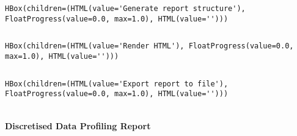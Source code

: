 \documentclass[11pt]{article}
\begin{document}
    
    \begin{Verbatim}[commandchars=\\\{\}]
HBox(children=(HTML(value='Generate report structure'), FloatProgress(value=0.0, max=1.0), HTML(value='')))
    \end{Verbatim}

    
    \begin{Verbatim}[commandchars=\\\{\}]

    \end{Verbatim}

    
    \begin{Verbatim}[commandchars=\\\{\}]
HBox(children=(HTML(value='Render HTML'), FloatProgress(value=0.0, max=1.0), HTML(value='')))
    \end{Verbatim}

    
    \begin{Verbatim}[commandchars=\\\{\}]

    \end{Verbatim}

    
    \begin{Verbatim}[commandchars=\\\{\}]
HBox(children=(HTML(value='Export report to file'), FloatProgress(value=0.0, max=1.0), HTML(value='')))
    \end{Verbatim}

    
    \begin{Verbatim}[commandchars=\\\{\}]

    \end{Verbatim}

    \hypertarget{discretised-data-profiling-report}{%
\paragraph{Discretised Data Profiling
Report}\label{discretised-data-profiling-report}}
\end{document}
